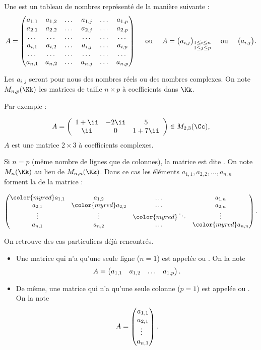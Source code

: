 \documentclass[11pt,class=report,crop=false]{standalone}
\begin{document}
Une  est un tableau de nombres représenté de la manière suivante :
$$A=\begin{pmatrix}
a_{1,1}& a_{1,2}& \dots & a_{1,j}& \dots & a_{1,p}\cr
a_{2,1}& a_{2,2}& \dots & a_{2,j}& \dots &a_{2,p}\cr
\dots & \dots & \dots & \dots & \dots & \dots \cr
a_{i,1}& a_{i,2} & \dots & a_{i,j}& \dots &a_{i,p} \cr
\dots & \dots & \dots & \dots & \dots & \dots \cr
a_{n,1}& a_{n,2}& \dots & a_{n,j}& \dots & a_{n,p}\cr
\end{pmatrix}
\quad \text{ ou } \quad
A= \big(a_{i,j}\big)_{\substack{1\leq i \leq n \\ 1\leq j \leq p}}
\quad \text{ ou } \quad
\big(a_{i,j}\big).
$$


Les $a_{i,j}$ seront pour nous des nombres réels ou des nombres complexes. 
On note $M_{n,p}(\Kk)$ les matrices de taille $n\times p$ à coefficients dans $\Kk$.

Par exemple :

$$ A  =  \left(
 \begin{array}{ccc}
1+\ii & -2\ii & 5\\
\ii & 0  & 1+7\ii
\end{array}
\right) \in M_{2,3}(\Cc),$$
$A$ est une matrice $2\times 3$ à coefficients complexes.

Si $n=p$ (même nombre de lignes que de colonnes), la matrice est dite 
.
On note $M_{n}(\Kk)$ au lieu de $M_{n,n}(\Kk)$.
Dans ce cas les éléments $a_{1,1}, a_{2,2}, \ldots, a_{n,n}$ forment la  de la matrice :

  \[
\begin{pmatrix}
 {\color{myred}a_{1,1}} & a_{1,2} & \dots & a_{1,n}\\
 a_{2,1} & {\color{myred}a_{2,2}} & \dots & a_{2,n}\\
 \vdots& \vdots & {\color{myred}\ddots}  & \vdots\\
 a_{n,1} & a_{n,2} & \dots & {\color{myred}a_{n,n}}
\end{pmatrix}
 .\]

On retrouve des cas particuliers déjà rencontrés. 
\begin{itemize}
  \item  Une matrice qui n'a qu'une seule ligne ($n=1$) est appelée 
  ou . On la note
$$A=\begin{pmatrix}
a_{1,1}& a_{1,2}&  \ldots & a_{1,p}\cr
\end{pmatrix}.$$

  \item De même, une matrice qui n'a qu'une seule colonne ($p=1$) est appelée  ou . On la note
$$A=\begin{pmatrix}
a_{1,1}\cr
a_{2,1}\cr
\enspace \vdots \hfill \cr
a_{n,1}\cr
\end{pmatrix}.$$

\end{itemize}
\end{document}

